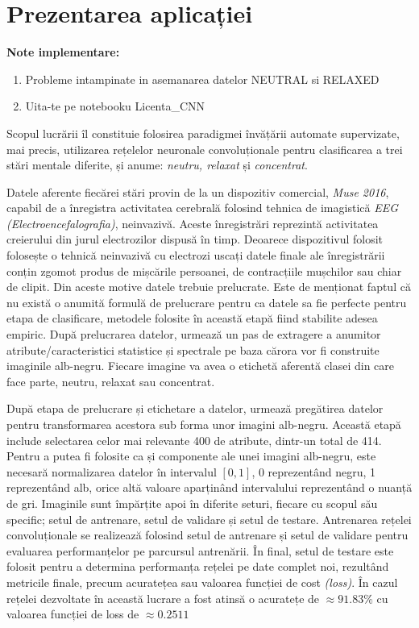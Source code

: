 \chapter{Prezentarea aplicației}\label{ch:3implementare}

\textbf{Note implementare:}
\begin{enumerate}
\item Probleme intampinate in asemanarea datelor NEUTRAL si RELAXED
\item Uita-te pe notebooku Licenta\_CNN
\end{enumerate}

Scopul lucrării îl constituie folosirea paradigmei învățării automate supervizate, mai precis, utilizarea rețelelor neuronale convoluționale pentru clasificarea a trei stări mentale diferite, și anume: \textit{neutru, relaxat} și \textit{concentrat}. 

Datele aferente fiecărei stări provin de la un dispozitiv comercial, \textit{Muse 2016}, capabil de a înregistra activitatea cerebrală folosind tehnica de imagistică \textit{EEG (Electroencefalografia)}, neinvazivă. Aceste înregistrări reprezintă activitatea creierului din jurul electrozilor dispusă în timp. Deoarece dispozitivul folosit folosește o tehnică neinvazivă cu electrozi uscați datele finale ale înregistrării conțin zgomot produs de mișcările persoanei, de contracțiile mușchilor sau chiar de clipit. Din aceste motive datele trebuie prelucrate. Este de menționat faptul că nu există o anumită formulă de prelucrare pentru ca datele sa fie perfecte pentru etapa de clasificare, metodele folosite în această etapă fiind stabilite adesea empiric. După prelucrarea datelor, urmează un pas de extragere a anumitor atribute/caracteristici statistice și spectrale pe baza cărora vor fi construite imaginile alb-negru. Fiecare imagine va avea o etichetă aferentă clasei din care face parte, neutru, relaxat sau concentrat.

După etapa de prelucrare și etichetare a datelor, urmează pregătirea datelor pentru transformarea acestora sub forma unor imagini alb-negru. Această etapă include selectarea celor mai relevante 400 de atribute, dintr-un total de 414. Pentru a putea fi folosite ca și componente ale unei imagini alb-negru, este necesară normalizarea datelor în intervalul $[0,1]$, 0 reprezentând negru, 1 reprezentând alb, orice altă valoare aparținând intervalului reprezentând o nuanță de gri. Imaginile sunt împărțite apoi în diferite seturi, fiecare cu scopul său specific; setul de antrenare, setul de validare și setul de testare. Antrenarea rețelei convoluționale se realizează folosind setul de antrenare și setul de validare pentru evaluarea performanțelor pe parcursul antrenării. În final, setul de testare este folosit pentru a determina performanța rețelei pe date complet noi, rezultând metricile finale, precum acuratețea sau valoarea funcției de cost \textit{(loss)}. În cazul rețelei dezvoltate în această lucrare a fost atinsă o acuratețe de $\approx91.83\%$ cu valoarea funcției de loss de $\approx0.2511$

